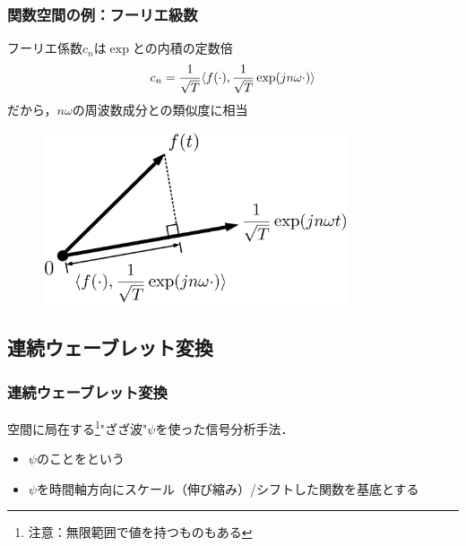 \documentclass[dvipdfmx,graphicx,14pt]{beamer}
\begin{document}
\begin{frame}[c]
    \frametitle{関数空間の例：フーリエ級数}
    フーリエ係数$c_{n}$は$\exp$との内積の定数倍
    \begin{align}
        c_{n} = \frac{1}{\sqrt{T}} \langle f(\cdot), \frac{1}{\sqrt{T}}\exp(jn\omega \cdot) \rangle
    \end{align}
    だから，$n\omega$の周波数成分との類似度に相当
    \begin{figure}
        \includegraphics[width=90mm]{./figs/fourior_function_projection.png}
    \end{figure}
\end{frame}

\subsection{連続ウェーブレット変換}

\begin{frame}[c]
    \frametitle{連続ウェーブレット変換}
    空間に局在する\footnote{注意：無限範囲で値を持つものもある}"ざざ波"$\psi$を使った信号分析手法．
    \begin{itemize}
        \item $\psi$のことをという
        \item $\psi$を時間軸方向にスケール（伸び縮み）/シフトした関数を基底とする
    \end{itemize}
\end{frame}
\end{document}
